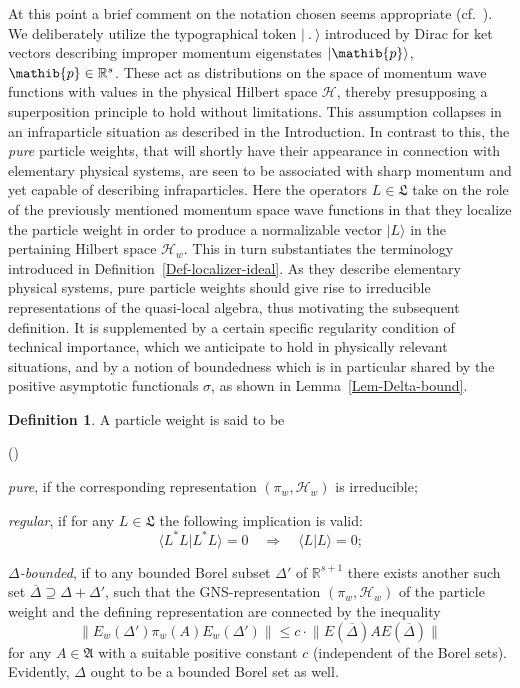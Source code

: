\documentclass[11pt,twoside,openright]{report}
\theoremstyle{definition}
\newtheorem{Def}{Definition}[chapter]
\theoremstyle{plain}
\theoremstyle{remark}
\theoremstyle{assumption}
\newcommand{\norm}[1]{\lVert #1 \rVert}
\newcommand{\ket}[1]{\vert #1 \rangle}
\newcommand{\scp}[2]{\langle #1 \vert #2 \rangle}
\newcommand{\Afrak}{\mathfrak{A}}
\newcommand{\Lfrak}{\mathfrak{L}}
\newcommand{\pib}{\mathib{p}}
\newcommand{\Hscr}{\mathscr{H}}
\newcommand{\Rs}{\mathbb{R}^s}
\newcommand{\Rsone}{\mathbb{R}^{s + 1}}
\newcommand{\Deltabar}{\overline{\Delta}}
\newcommand{\EDbar}{E ( \overline{\Delta} )}
\newcommand{\EwDprime}{E_w ( \Delta' )}
\newcounter{defitem}
\newenvironment{deflist}{\begin{list}{(\alph{defitem})}%
  {\usecounter{defitem} \setlength{\topsep}{0ex}%
   \setlength{\parsep}{0.2ex} \setlength{\itemsep}{0.4ex}%
   \setlength{\leftmargin}{0em} \setlength{\itemindent}{0.5em}%
   }}{\end{list}}
\begin{document}
At this point a brief comment on the notation chosen seems
appropriate (cf.~\cite{buchholz/porrmann/stein:1991}). We deliberately
utilize the typographical token $\ket{~.~}$ introduced by Dirac
\cite[\S\,23]{dirac:1958} for ket vectors describing improper momentum
eigenstates $\ket{\pib}$, $\pib \in \Rs$. These act as distributions
on the space of momentum wave functions with values in the physical
Hilbert space $\Hscr$, thereby presupposing a superposition principle
to hold without limitations. This assumption collapses in an
infraparticle situation as described in the Introduction. In contrast
to this, the \emph{pure} particle weights, that will shortly have
their appearance in connection with elementary physical systems, are
seen to be associated with sharp momentum and yet capable of
describing infraparticles. Here the operators $L \in \Lfrak$ take on
the role of the previously mentioned momentum space wave functions in
that they localize the particle weight in order to produce a
normalizable vector $\ket{L}$ in the pertaining Hilbert space
$\Hscr_w$. This in turn substantiates the terminology introduced in
Definition~\ref{Def-localizer-ideal}. As they describe elementary
physical systems, pure particle weights should give rise to
irreducible representations of the quasi-local algebra, thus
motivating the subsequent definition. It is supplemented by a certain
specific regularity condition of technical importance, which we
anticipate to hold in physically relevant situations, and by a notion
of boundedness which is in particular shared by the positive
asymptotic functionals $\sigma$, as shown in
Lemma~\ref{Lem-Delta-bound}.
\begin{Def}
  \label{Def-weight-classification}
  A particle weight is said to be
  \begin{deflist}
    \item \emph{pure}, if the corresponding representation $( \pi_w ,
      \Hscr_w )$ is irreducible;
    \item \emph{regular}, if for any $L \in \Lfrak$ the following
      implication is valid:
      \begin{equation*}
        \scp{L^* L}{L^* L} = 0 \quad \Longrightarrow \quad \scp{L}{L}
        = 0 \text{;}
      \end{equation*}
    \item \emph{$\Delta$-bounded}, if to any bounded Borel subset
      $\Delta'$ of $\Rsone$ there exists another such set $\Deltabar
      \supseteq \Delta + \Delta'$, such that the GNS-representation $(
      \pi_w , \Hscr_w )$ of the particle weight and the defining 
      representation are connected by the inequality
      \begin{equation}
        \label{eq-Delta-boundedness}
        \norm{\EwDprime \pi_w ( A ) \EwDprime} \leqslant c \cdot
        \norm{\EDbar A \EDbar}
      \end{equation}
      for any $A \in \Afrak$ with a suitable positive constant $c$ 
      (independent of the Borel sets). Evidently, $\Delta$ ought to be
      a bounded Borel set as well.
  \end{deflist}
\end{Def}
\end{document}
